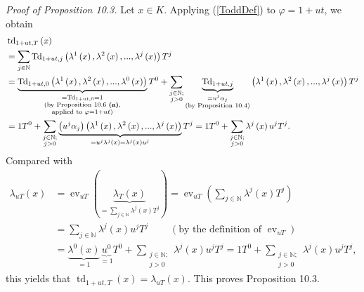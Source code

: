 \documentclass[numbers=enddot,12pt,final,onecolumn,notitlepage]{scrartcl}%
\begin{document}
\textit{Proof of Proposition 10.3.} Let $x\in K$. Applying (\ref{ToddDef}) to
$\varphi=1+ut$, we obtain%
\begin{align*}
&  \operatorname*{td}\nolimits_{1+ut,T}\left(  x\right) \\
&  =\sum_{j\in\mathbb{N}}\operatorname*{Td}\nolimits_{1+ut,j}\left(
\lambda^{1}\left(  x\right)  ,\lambda^{2}\left(  x\right)  ,...,\lambda
^{j}\left(  x\right)  \right)  T^{j}\\
&  =\underbrace{\operatorname*{Td}\nolimits_{1+ut,0}\left(  \lambda^{1}\left(
x\right)  ,\lambda^{2}\left(  x\right)  ,...,\lambda^{0}\left(  x\right)
\right)  }_{\substack{=\operatorname*{Td}\nolimits_{1+ut,0}=1\\\text{(by
Proposition 10.6 \textbf{(a)},}\\\text{applied to }\varphi=1+ut\text{)}}%
}T^{0}+\sum_{\substack{j\in\mathbb{N};\\j>0}}\underbrace{\operatorname*{Td}%
\nolimits_{1+ut,j}}_{\substack{=u^{j}\alpha_{j}\\\text{(by Proposition 10.4)}%
}}\left(  \lambda^{1}\left(  x\right)  ,\lambda^{2}\left(  x\right)
,...,\lambda^{j}\left(  x\right)  \right)  T^{j}\\
&  =1T^{0}+\sum_{\substack{j\in\mathbb{N};\\j>0}}\underbrace{\left(
u^{j}\alpha_{j}\right)  \left(  \lambda^{1}\left(  x\right)  ,\lambda
^{2}\left(  x\right)  ,...,\lambda^{j}\left(  x\right)  \right)  }%
_{=u^{j}\lambda^{j}\left(  x\right)  =\lambda^{j}\left(  x\right)  u^{j}}%
T^{j}=1T^{0}+\sum_{\substack{j\in\mathbb{N};\\j>0}}\lambda^{j}\left(
x\right)  u^{j}T^{j}.
\end{align*}
Compared with%
\begin{align*}
\lambda_{uT}\left(  x\right)   &  =\operatorname*{ev}\nolimits_{uT}\left(
\underbrace{\lambda_{T}\left(  x\right)  }_{=\sum\limits_{j\in\mathbb{N}%
}\lambda^{j}\left(  x\right)  T^{j}}\right)  =\operatorname*{ev}%
\nolimits_{uT}\left(  \sum\limits_{j\in\mathbb{N}}\lambda^{j}\left(  x\right)
T^{j}\right) \\
&  =\sum\limits_{j\in\mathbb{N}}\lambda^{j}\left(  x\right)  u^{j}%
T^{j}\ \ \ \ \ \ \ \ \ \ \left(  \text{by the definition of }%
\operatorname*{ev}\nolimits_{uT}\right) \\
&  =\underbrace{\lambda^{0}\left(  x\right)  }_{=1}\underbrace{u^{0}}%
_{=1}T^{0}+\sum_{\substack{j\in\mathbb{N};\\j>0}}\lambda^{j}\left(  x\right)
u^{j}T^{j}=1T^{0}+\sum_{\substack{j\in\mathbb{N};\\j>0}}\lambda^{j}\left(
x\right)  u^{j}T^{j},
\end{align*}
this yields that $\operatorname*{td}\nolimits_{1+ut,T}\left(  x\right)
=\lambda_{uT}\left(  x\right)  $. This proves Proposition 10.3.
\end{document}
